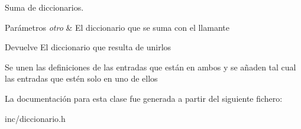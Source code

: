Suma de diccionarios. 


\begin{DoxyParams}{Parámetros}
{\em otro} & El diccionario que se suma con el llamante \\
\hline
\end{DoxyParams}
\begin{DoxyReturn}{Devuelve}
El diccionario que resulta de unirlos
\end{DoxyReturn}
Se unen las definiciones de las entradas que están en ambos y se añaden tal cual las entradas que estén solo en uno de ellos 

La documentación para esta clase fue generada a partir del siguiente fichero\+:\begin{DoxyCompactItemize}
\item 
inc/diccionario.\+h\end{DoxyCompactItemize}
